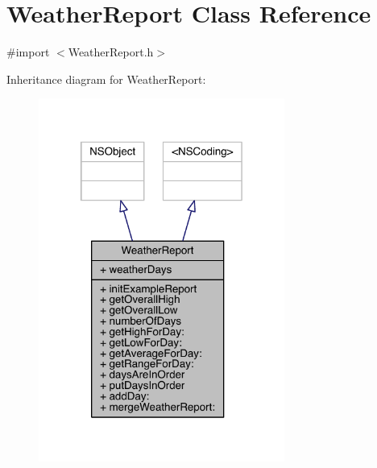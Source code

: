 \hypertarget{interface_weather_report}{\section{Weather\-Report Class Reference}
\label{interface_weather_report}
}


{\ttfamily \#import $<$Weather\-Report.\-h$>$}



Inheritance diagram for Weather\-Report\-:
\nopagebreak
\begin{figure}[H]
\begin{center}
\leavevmode
\includegraphics[width=229pt]{interface_weather_report__inherit__graph}
\end{center}
\end{figure}


